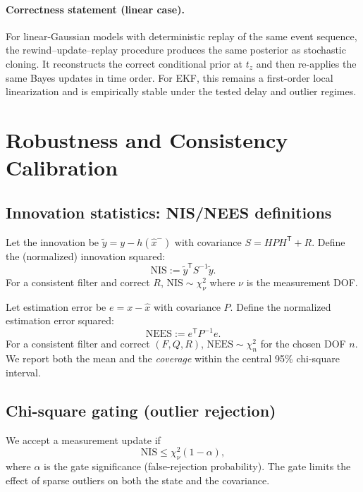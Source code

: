 \documentclass[10pt]{article}
\newcommand{\trans}{^{\mathsf T}}
\newcommand{\defeq}{\mathrel{:=}}
\begin{document}
\paragraph{Correctness statement (linear case).}
For linear-Gaussian models with deterministic replay of the same event sequence,
the rewind--update--replay procedure produces the same posterior as stochastic cloning.
It reconstructs the correct conditional prior at $t_z$ and then re-applies the same Bayes updates in time order.
For EKF, this remains a first-order local linearization and is empirically stable under the tested delay and outlier regimes.

\section{Robustness and Consistency Calibration}
\label{sec:robustness-consistency}
\subsection{Innovation statistics: NIS/NEES definitions}
Let the innovation be $\tilde y = y - h(\hat x^-)$ with covariance $S = HPH\trans + R$.
Define the (normalized) innovation squared:
\begin{equation}
  \mathrm{NIS} \defeq \tilde y\trans S^{-1}\tilde y.
\end{equation}
For a consistent filter and correct $R$, $\mathrm{NIS}\sim \chi^2_\nu$ where $\nu$ is the measurement DOF.

Let estimation error be $e = x - \hat x$ with covariance $P$.
Define the normalized estimation error squared:
\begin{equation}
  \mathrm{NEES} \defeq e\trans P^{-1}e.
\end{equation}
For a consistent filter and correct $(F,Q,R)$, $\mathrm{NEES}\sim \chi^2_n$ for the chosen DOF $n$.
We report both the mean and the \emph{coverage} within the central 95\% chi-square interval.

\subsection{Chi-square gating (outlier rejection)}
We accept a measurement update if
\begin{equation}
  \mathrm{NIS} \le \chi^2_{\nu}(1-\alpha),
\end{equation}
where $\alpha$ is the gate significance (false-rejection probability).
The gate limits the effect of sparse outliers on both the state and the covariance.
\end{document}
